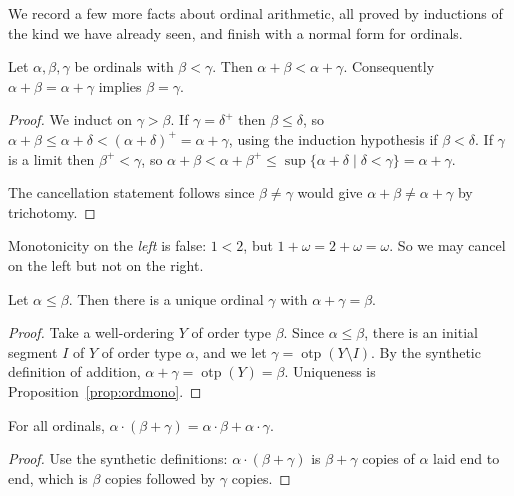 \documentclass[a4paper]{scrartcl}
\newcommand{\otp}{\operatorname{otp}}
\begin{document}
We record a few more facts about ordinal arithmetic, all proved by inductions of the kind we have already seen, and finish with a normal form for ordinals.

\begin{proposition}\label{prop:ordmono}
  Let $\alpha, \beta, \gamma$ be ordinals with $\beta < \gamma$. Then $\alpha + \beta < \alpha + \gamma$. Consequently $\alpha + \beta = \alpha + \gamma$ implies $\beta = \gamma$.
\end{proposition}
\begin{proof}
  We induct on $\gamma > \beta$. If $\gamma = \delta^+$ then $\beta \leq \delta$, so $\alpha + \beta \leq \alpha + \delta < (\alpha+\delta)^+ = \alpha + \gamma$, using the induction hypothesis if $\beta < \delta$. If $\gamma$ is a limit then $\beta^+ < \gamma$, so $\alpha + \beta < \alpha + \beta^+ \leq \sup\{\alpha + \delta \mid \delta < \gamma\} = \alpha + \gamma$.

  The cancellation statement follows since $\beta \neq \gamma$ would give $\alpha + \beta \neq \alpha + \gamma$ by trichotomy.
\end{proof}

Monotonicity on the \emph{left} is false: $1 < 2$, but $1 + \omega = 2 + \omega = \omega$. So we may cancel on the left but not on the right.

\begin{proposition}
  Let $\alpha \leq \beta$. Then there is a unique ordinal $\gamma$ with $\alpha + \gamma = \beta$.
\end{proposition}
\begin{proof}
  Take a well-ordering $Y$ of order type $\beta$. Since $\alpha \leq \beta$, there is an initial segment $I$ of $Y$ of order type $\alpha$, and we let $\gamma = \otp(Y \setminus I)$. By the synthetic definition of addition, $\alpha + \gamma = \otp(Y) = \beta$. Uniqueness is Proposition~\ref{prop:ordmono}.
\end{proof}

\begin{proposition}[Distributivity]
  For all ordinals, $\alpha \cdot (\beta + \gamma) = \alpha\cdot\beta + \alpha\cdot\gamma$.
\end{proposition}
\begin{proof}
  Use the synthetic definitions: $\alpha\cdot(\beta+\gamma)$ is $\beta + \gamma$ copies of $\alpha$ laid end to end, which is $\beta$ copies followed by $\gamma$ copies.
\end{proof}
\end{document}
